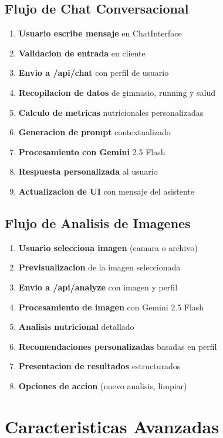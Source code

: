 \documentclass[12pt,a4paper]{article}
\begin{document}
\subsection{Flujo de Chat Conversacional}

\begin{enumerate}
    \item \textbf{Usuario escribe mensaje} en ChatInterface
    \item \textbf{Validacion de entrada} en cliente
    \item \textbf{Envio a /api/chat} con perfil de usuario
    \item \textbf{Recopilacion de datos} de gimnasio, running y salud
    \item \textbf{Calculo de metricas} nutricionales personalizadas
    \item \textbf{Generacion de prompt} contextualizado
    \item \textbf{Procesamiento con Gemini} 2.5 Flash
    \item \textbf{Respuesta personalizada} al usuario
    \item \textbf{Actualizacion de UI} con mensaje del asistente
\end{enumerate}

\subsection{Flujo de Analisis de Imagenes}

\begin{enumerate}
    \item \textbf{Usuario selecciona imagen} (camara o archivo)
    \item \textbf{Previsualizacion} de la imagen seleccionada
    \item \textbf{Envio a /api/analyze} con imagen y perfil
    \item \textbf{Procesamiento de imagen} con Gemini 2.5 Flash
    \item \textbf{Analisis nutricional} detallado
    \item \textbf{Recomendaciones personalizadas} basadas en perfil
    \item \textbf{Presentacion de resultados} estructurados
    \item \textbf{Opciones de accion} (nuevo analisis, limpiar)
\end{enumerate}

\section{Caracteristicas Avanzadas}
\end{document}

